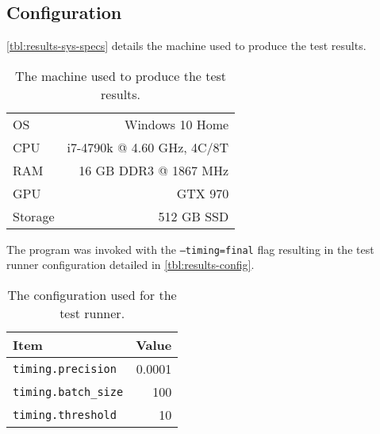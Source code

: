 \subsection{Configuration}

\autoref{tbl:results-sys-specs} details the machine used to produce the test results.

\begin{table}[H] 
    \centering
    \begin{tabular}{l|r}
        \toprule

        OS & Windows 10 Home \\
        CPU & i7-4790k @ 4.60 GHz, 4C/8T \\
        RAM & 16 GB DDR3 @ 1867 MHz \\
        GPU & GTX 970 \\
        Storage & 512 GB SSD \\

        \bottomrule
    \end{tabular}
    \caption{The machine used to produce the test results.}
    \label{tbl:results-sys-specs}
\end{table}

The program was invoked with the \texttt{--timing=final} flag resulting in the test runner configuration detailed in \autoref{tbl:results-config}.

\begin{table}[H] 
    \centering
    \begin{tabular}{l|r}
        \toprule
        Item & Value \\
        \midrule

        \texttt{timing.precision} & 0.0001 \\
        \texttt{timing.batch\_size} & 100 \\
        \texttt{timing.threshold} & 10 \\

        \bottomrule
    \end{tabular}
    \caption{The configuration used for the test runner.}
    \label{tbl:results-config}
\end{table}
